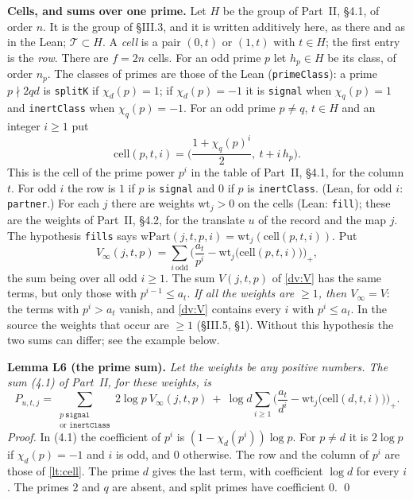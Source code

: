 \documentclass[11pt,letterpaper]{article}
\begin{document}
\textbf{Cells, and sums over one prime.} Let $H$ be the group of Part~II, \S4.1, of order $n$. It is the
group of \S III.3, and it is written additively here, as there and as in the Lean; $\mathcal T\subset H$.
A \emph{cell} is a pair $(0,t)$ or $(1,t)$ with $t\in H$; the first entry is the \emph{row}. There are
$f=2n$ cells. For an odd prime $p$ let $h_p\in H$ be its class, of order $n_p$. The classes of primes are
those of the Lean (\texttt{primeClass}): a prime $p\nmid2qd$ is \texttt{splitK} if $\chi_d(p)=1$; if
$\chi_d(p)=-1$ it is \texttt{signal} when $\chi_q(p)=1$ and \texttt{inertClass} when $\chi_q(p)=-1$. For an
odd prime $p\ne q$, $t\in H$ and an integer $i\ge1$ put
\begin{equation}\label{lt:cell}
 \mathrm{cell}(p,t,i)=\Big(\frac{1+\chi_q(p)^i}2,\ t+i\,h_p\Big).
\end{equation}
This is the cell of the prime power $p^i$ in the table of Part~II, \S4.1, for the column $t$. For odd $i$
the row is $1$ if $p$ is \texttt{signal} and $0$ if $p$ is \texttt{inertClass}. (Lean, for odd $i$:
\texttt{partner}.) For each $j$ there are weights $\mathrm{wt}_j>0$ on the cells (Lean: \texttt{fill});
these are the weights of Part~II, \S4.2, for the translate $u$ of the record and the map $j$. The
hypothesis \texttt{fills} says $\mathrm{wPart}(j,t,p,i)=\mathrm{wt}_j(\mathrm{cell}(p,t,i))$. Put
\begin{equation}\label{lt:Vdef}
 V_\infty(j,t,p)=\sum_{i\ \mathrm{odd}}\Big(\frac{a_t}{p^i}-\mathrm{wt}_j\big(\mathrm{cell}(p,t,i)\big)\Big)_+ ,
\end{equation}
the sum being over all odd $i\ge1$. The sum $V(j,t,p)$ of \eqref{dv:V} has the same terms, but only
those with $p^{i-1}\le a_t$. \emph{If all the weights are $\ge1$, then $V_\infty=V$}: the terms with
$p^i>a_t$ vanish, and \eqref{dv:V} contains every $i$ with $p^i\le a_t$. In the source the weights that
occur are $\ge1$ (\S III.5, \S1). Without this hypothesis the two sums can differ; see the example below.

\textbf{Lemma L6 (the prime sum).} \emph{Let the weights be any positive numbers. The sum \textup{(4.1)}
of Part~II, for these weights, is}
\begin{equation}\label{lt:P}
 P_{u,t,j}=\sum_{\substack{p\ \mathtt{signal}\\\text{or }\mathtt{inertClass}}}2\log p\ V_\infty(j,t,p)\ +\
 \log d\sum_{i\ge1}\Big(\frac{a_t}{d^i}-\mathrm{wt}_j\big(\mathrm{cell}(d,t,i)\big)\Big)_+ .
\end{equation}
\emph{Proof.} In (4.1) the coefficient of $p^i$ is $(1-\chi_d(p^i))\log p$. For $p\ne d$ it is $2\log p$
if $\chi_d(p)=-1$ and $i$ is odd, and $0$ otherwise. The row and the column of $p^i$ are those of
\eqref{lt:cell}. The prime $d$ gives the last term, with coefficient $\log d$ for every $i$. The primes $2$
and $q$ are absent, and split primes have coefficient $0$. \qed
\end{document}

